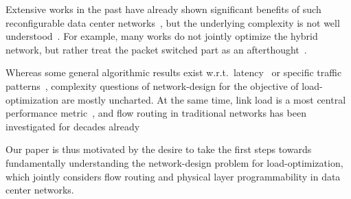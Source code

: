 \documentclass[sigconf]{acmart}
\begin{document}
% 
Extensive  works in the past have already shown significant benefits of such reconfigurable data center networks~\cite{DBLP:journals/sigact/FoersterS19}, but the underlying complexity is not well understood~\cite{DBLP:journals/ccr/AvinS18}.
%
For example, many works do not jointly optimize the hybrid network, but rather treat the packet switched part as an afterthought~\cite{DBLP:conf/ancs/FoersterGS18}.

%

%
Whereas some general algorithmic results exist w.r.t.\ latency~\cite{projector,DBLP:journals/ccr/FoersterPS19} or specific traffic patterns~\cite{eclipse-journal,DBLP:conf/infocom/Avin0019}, complexity questions of network-design for the objective of load-optimization are mostly uncharted.
%
At the same time, link load is a most central performance metric~\cite{DBLP:conf/conext/CaoXYGLYZWXM13,DBLP:journals/ton/SridharanGD05}, and flow routing in traditional networks has been investigated for decades already~\cite{DBLP:books/daglib/0069809}
%


%
Our paper is thus motivated by the desire to take the first steps towards fundamentally understanding the network-design problem for load-optimization, which jointly considers flow routing and physical layer programmability in data center networks.
\end{document}
